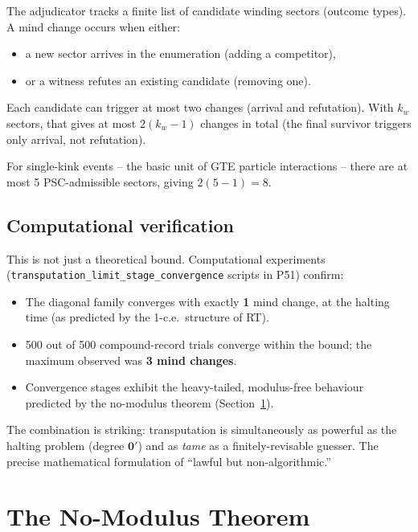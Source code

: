 \documentclass[11pt,a4paper]{article}
\newcommand{\lean}[1]{\texttt{#1}}
\newcommand{\zerp}{\mathbf{0}'}
\begin{document}
The adjudicator tracks a finite list of candidate winding sectors (outcome
types). A mind change occurs when either:
\begin{itemize}
  \item a new sector arrives in the enumeration (adding a competitor),
  \item or a witness refutes an existing candidate (removing one).
\end{itemize}
Each candidate can trigger at most two changes (arrival and refutation).
With $k_w$ sectors, that gives at most $2(k_w - 1)$ changes in total
(the final survivor triggers only arrival, not refutation).

For single-kink events -- the basic unit of GTE particle interactions --
there are at most 5 PSC-admissible sectors, giving $2(5-1) = 8$.

\subsection{Computational verification}

This is not just a theoretical bound.
Computational experiments (\lean{transputation\_limit\_stage\_\allowbreak{}convergence}
scripts in P51) confirm:
\begin{itemize}
  \item The diagonal family converges with exactly \textbf{1} mind change,
    at the halting time (as predicted by the 1-c.e.\ structure of RT).
  \item 500 out of 500 compound-record trials converge within the bound;
    the maximum observed was \textbf{3 mind changes}.
  \item Convergence stages exhibit the heavy-tailed, modulus-free behaviour
    predicted by the no-modulus theorem (Section~\ref{sec:nomodulus}).
\end{itemize}

The combination is striking: transputation is simultaneously as powerful as
the halting problem (degree $\zerp$) and as \emph{tame} as a
finitely-revisable guesser.  The precise mathematical formulation of
``lawful but non-algorithmic.''

\section{The No-Modulus Theorem}
\label{sec:nomodulus}
\end{document}
